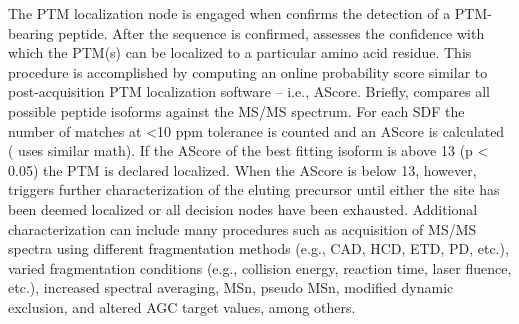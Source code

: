 The PTM localization node is engaged when \inseq{} confirms the detection of a PTM-bearing peptide. After the sequence is confirmed, \inseq{} assesses the confidence with which the PTM(s) can be localized to a particular amino acid residue. This procedure is accomplished by computing an online probability score similar to post-acquisition PTM localization software -- i.e., AScore.\cite{ascore} Briefly, \inseq{} compares all possible peptide isoforms against the MS/MS spectrum. For each SDF the number of matches at <10 ppm tolerance is counted and an AScore is calculated (\inseq{} uses similar math). If the AScore of the best fitting isoform is above 13 (p < 0.05) the PTM is declared localized. When the AScore is below 13, however, \inseq{} triggers further characterization of the eluting precursor until either the site has been deemed localized or all decision nodes have been exhausted. Additional characterization can include many procedures such as acquisition of MS/MS spectra using different fragmentation methods (e.g., CAD, HCD, ETD, PD, etc.), varied fragmentation conditions (e.g., collision energy, reaction time, laser fluence, etc.), increased spectral averaging, MSn, pseudo MSn, modified dynamic exclusion, and altered AGC target values, among others.\cite{neutralloss}
